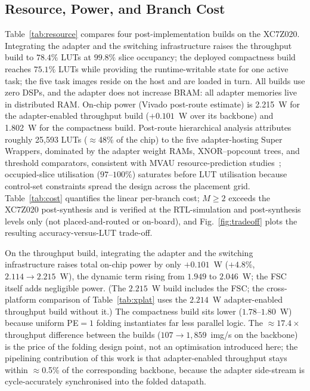 \documentclass[journal]{IEEEtran}
\begin{document}
\subsection{Resource, Power, and Branch Cost}
Table~\ref{tab:resource} compares four post-implementation builds on the XC7Z020. Integrating the adapter and the switching infrastructure raises the throughput build to $78.4\%$ LUTs at $99.8\%$ slice occupancy; the deployed compactness build reaches $75.1\%$ LUTs while providing the runtime-writable state for one active task; the five task images reside on the host and are loaded in turn. All builds use zero DSPs, and the adapter does not increase BRAM: all adapter memories live in distributed RAM. On-chip power (Vivado post-route estimate) is 2.215~W for the adapter-enabled throughput build ($+0.101$~W over its backbone) and 1.802~W for the compactness build. Post-route hierarchical analysis attributes roughly 25{,}593 LUTs ($\approx$48\% of the chip) to the five adapter-hosting Super Wrappers, dominated by the adapter weight RAMs, XNOR--popcount trees, and threshold comparators, consistent with MVAU resource-prediction studies~\cite{Arend2025MVAUPredict}; occupied-slice utilisation ($97$--$100\%$) saturates before LUT utilisation because control-set constraints spread the design across the placement grid. Table~\ref{tab:cost} quantifies the linear per-branch cost; $M{\geq}2$ exceeds the XC7Z020 post-synthesis and is verified at the RTL-simulation and post-synthesis levels only (not placed-and-routed or on-board), and Fig.~\ref{fig:tradeoff} plots the resulting accuracy-versus-LUT trade-off.

On the throughput build, integrating the adapter and the switching infrastructure raises total on-chip power by only $+0.101$~W ($+4.8\%$, $2.114 \to 2.215$~W), the dynamic term rising from $1.949$ to $2.046$~W; the FSC itself adds negligible power. (The $2.215$~W build includes the FSC; the cross-platform comparison of Table~\ref{tab:xplat} uses the $2.214$~W adapter-enabled throughput build without it.) The compactness build sits lower ($1.78$--$1.80$~W) because uniform PE${=}1$ folding instantiates far less parallel logic. The $\approx$$17.4\times$ throughput difference between the builds ($107 \to 1{,}859$~img/s on the backbone) is the price of the folding design point, not an optimisation introduced here; the pipelining contribution of this work is that adapter-enabled throughput stays within $\approx$0.5\% of the corresponding backbone, because the adapter side-stream is cycle-accurately synchronised into the folded datapath.
\end{document}
